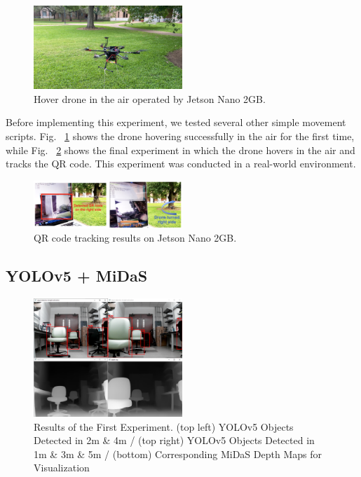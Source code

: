 \begin{figure}[H]
    \centerline{\includegraphics[width=0.5\textwidth]{Figures/Results/Drone_Hover.JPG}}
    \caption{Hover drone in the air operated by Jetson Nano 2GB.}
    \label{fig11}
\end{figure}

Before implementing this experiment, we tested several other simple movement scripts. Fig. ~\ref{fig11} shows the drone hovering successfully in the air for the first time, while Fig. ~\ref{fig12} shows the final experiment in which the drone hovers in the air and tracks the QR code. This experiment was conducted in a real-world environment.

\begin{figure}[H]
    \centerline{\includegraphics[width=0.5\textwidth]{Figures/Results/QR_code_Tracking_Successfully.png}}
    \caption{QR code tracking results on Jetson Nano 2GB.}
    \label{fig12}
\end{figure}

\subsection{YOLOv5 + MiDaS}

\begin{figure}[H]
    \centerline{\includegraphics[width=0.5\textwidth]{Figures/Results/exp1.png}}
    \caption{Results of the First Experiment. (top left) YOLOv5 Objects Detected in 2m \& 4m / (top right) YOLOv5 Objects Detected in 1m \& 3m \& 5m / (bottom) Corresponding MiDaS Depth Maps for Visualization}
    \label{fig13}
\end{figure}

